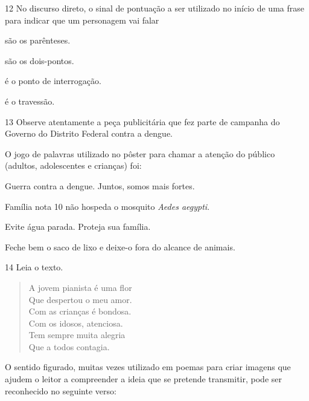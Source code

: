 \num{12} No discurso direto, o sinal de pontuação a ser utilizado no início
de uma frase para indicar que um personagem vai falar

\begin{escolha}
\item são os parênteses.

\item são os dois-pontos.

\item é o ponto de interrogação.

\item é o travessão.
\end{escolha}


\num{13} Observe atentamente a peça publicitária que fez parte de campanha do
Governo do Distrito Federal contra a dengue.



O jogo de palavras utilizado no pôster para chamar a atenção do público
(adultos, adolescentes e crianças) foi:

\begin{escolha}
\item Guerra contra a dengue. Juntos, somos mais fortes.

\item Família nota 10 não hospeda o mosquito \emph{Aedes aegypti}.

\item Evite água parada. Proteja sua família.

\item Feche bem o saco de lixo e deixe-o fora do alcance de animais.
\end{escolha}


\num{14} Leia o texto.

\begin{verse}
A jovem pianista é uma flor\\
Que despertou o meu amor.\\
Com as crianças é bondosa.\\
Com os idosos, atenciosa.\\
Tem sempre muita alegria\\
Que a todos contagia.\\
\end{verse}

O sentido figurado, muitas vezes utilizado em poemas para criar imagens
que ajudem o leitor a compreender a ideia que se pretende transmitir,
pode ser reconhecido no seguinte verso:

